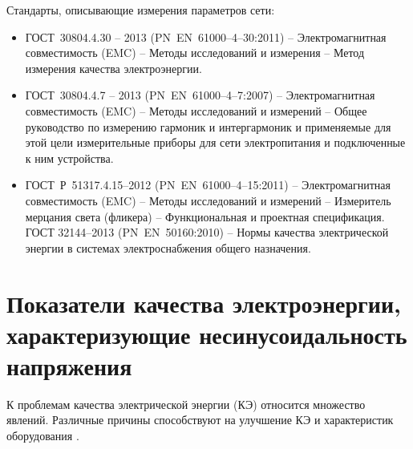 Стандарты, описывающие измерения параметров сети:
\begin{itemize}
	\item ГОСТ~30804.4.30 -- 2013 (PN~EN~61000--4--30:2011) -- Электромагнитная совместимость (EMC) -- Методы исследований и измерения – Метод измерения качества электроэнергии.
	\item ГОСТ~30804.4.7 -- 2013 (PN~EN~61000--4--7:2007) -- Электромагнитная совместимость (EMC) -- Методы исследований и измерений -- Общее руководство по измерению гармоник и интергармоник и применяемые для этой цели измерительные приборы для сети электропитания и подключенные к ним устройства. 
	\item ГОСТ~Р~51317.4.15--2012 (PN~EN~61000--4--15:2011) -- Электромагнитная совместимость (EMC) -- Методы исследований и измерений -- Измеритель мерцания света (фликера) -- Функциональная и проектная спецификация.
	ГОСТ 32144--2013 (PN~EN~50160:2010) -- Нормы качества электрической энергии в системах электроснабжения общего назначения.
\end{itemize}

\section{Показатели качества электроэнергии, характеризующие несинусоидальность напряжения} \label{sec:ch1/sec1_2}

К проблемам качества электрической энергии (КЭ) относится множество явлений. Различные причины способствуют на улучшение КЭ и характеристик оборудования \cite{ГОСТ13109-97}.


